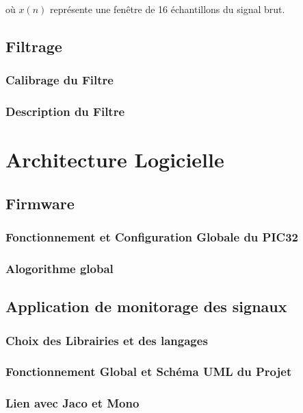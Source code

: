 \documentclass[letterpaper, twoside, 12pt, memoire, creativecommons, hyperref]{thETS}
\begin{document}
où $x(n)$ représente une fenêtre de 16 échantillons du signal brut.

\subsection{Filtrage}\label{CHfiltrage}

\subsubsection{Calibrage du Filtre}

\subsubsection{Description du Filtre}

\section{Architecture Logicielle}

\subsection{Firmware}

\subsubsection{Fonctionnement et Configuration Globale du PIC32}

\subsubsection{Alogorithme global}

\subsection{Application de monitorage des signaux}

\subsubsection{Choix des Librairies et des langages}

\subsubsection{Fonctionnement Global et Schéma UML du Projet}

\subsubsection{Lien avec Jaco et Mono}
\end{document}
